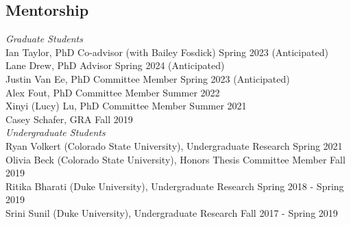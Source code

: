 \documentclass[margin,line]{res}
\begin{document}
\begin{resume}
% 

\section{\sc Mentorship}

{\em Graduate Students} \hfill \\
Ian Taylor, PhD Co-advisor (with Bailey Fosdick) \hfill Spring 2023 (Anticipated) \\
Lane Drew, PhD Advisor \hfill Spring 2024 (Anticipated) \\
Justin Van Ee, PhD Committee Member \hfill Spring 2023 (Anticipated) \\
Alex Fout, PhD Committee Member \hfill Summer 2022 \\
Xinyi (Lucy) Lu, PhD Committee Member \hfill Summer 2021 \\
Casey Schafer, GRA \hfill Fall 2019 \\






\vspace{-.3cm}
{\em Undergraduate Students} \hfill \\
Ryan Volkert (Colorado State University), Undergraduate Research \hfill Spring 2021 \\
Olivia Beck (Colorado State University), Honors Thesis Committee Member \hfill Fall 2019 \\
Ritika Bharati (Duke University), Undergraduate Research \hfill Spring 2018 - Spring 2019\\
Srini Sunil (Duke University), Undergraduate Research \hfill Fall 2017 - Spring 2019



\end{resume}
\end{document}
